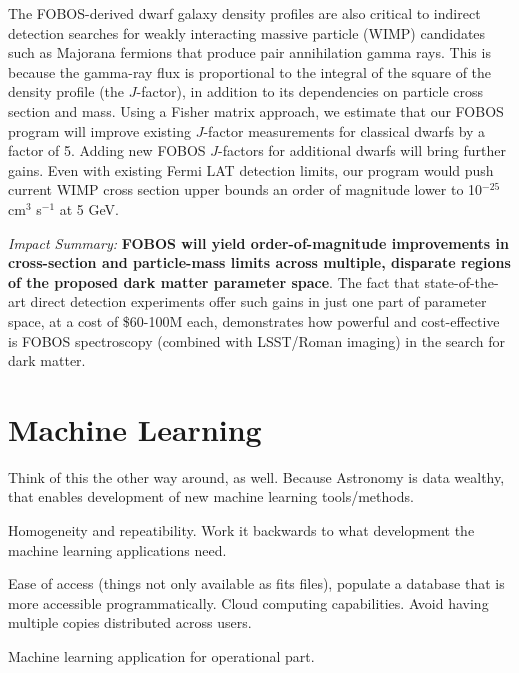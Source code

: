 \documentclass[11pt,a4paper,twoside,onecolumn,openany,final,oldfontcommands]{memoir}
\begin{document}
The FOBOS-derived dwarf galaxy density profiles are also critical to indirect detection searches for weakly interacting massive particle (WIMP) candidates such as Majorana fermions that produce pair annihilation gamma rays.  This is because the gamma-ray flux is proportional to the integral of the square of the density profile (the $J$-factor), in addition to its dependencies on particle cross section and mass.  Using a Fisher matrix approach, we estimate that our FOBOS program will improve existing $J$-factor measurements for classical dwarfs by a factor of 5.  Adding new FOBOS $J$-factors for additional dwarfs will bring further gains.  Even with existing Fermi LAT detection limits, our program would push current WIMP cross section upper bounds an order of magnitude lower to 10$^{-25}$ cm$^3$ s$^{-1}$ at 5 GeV.

\medskip
\noindent \emph{Impact Summary:} \textbf{FOBOS will yield order-of-magnitude improvements in cross-section and particle-mass limits across multiple, disparate regions of the proposed dark matter parameter space}.  The fact that state-of-the-art direct detection experiments offer such gains in just one part of parameter space, at a cost of \$60-100M each, demonstrates how powerful and cost-effective is FOBOS spectroscopy (combined with LSST/Roman imaging) in the search for dark matter.

\section{Machine Learning}


Think of this the other way around, as well.  Because Astronomy is data wealthy, that enables development of new machine learning tools/methods.

Homogeneity and repeatibility.  Work it backwards to what development the machine learning applications need.

Ease of access (things not only available as fits files), populate a database that is more accessible programmatically.  Cloud computing capabilities.  Avoid having multiple copies distributed across users.

Machine learning application for operational part.

\newpage


\end{document}
